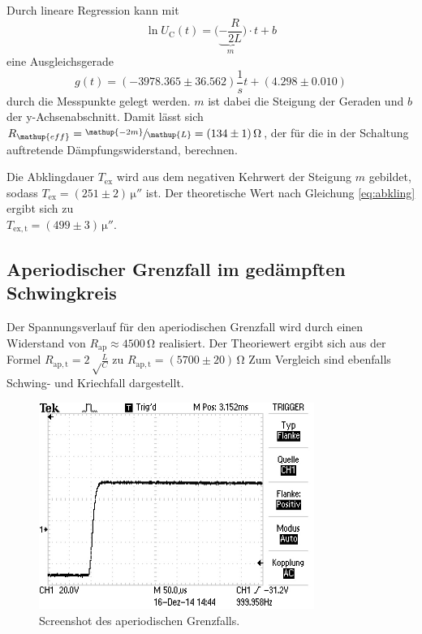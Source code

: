 Durch lineare Regression kann mit
\begin{equation}
\ln{U_\mathup{C}}(t)=\bigl(\underbrace{-\frac{R}{2L}}_m\bigr)\cdot t +b
\end{equation}
eine Ausgleichsgerade 
\begin{equation}
g(t)=(-3978.365\pm 36.562)\frac{1}{s} t + (4.298\pm0.010)
\end{equation}
durch die Messpunkte gelegt werden. 
$m$ ist dabei die Steigung der Geraden und $b$ der y-Achsenabschnitt.
Damit lässt sich $R_\mathup{eff}=\sfrac{\mathup{-2m}}{\mathup{L}}=(134\pm1)\,\si\ohm$, der für die in der Schaltung auftretende Dämpfungswiderstand, berechnen. 

Die Abklingdauer $T_\mathup{ex}$ wird aus dem negativen Kehrwert der Steigung $m$ gebildet, sodass $T_\mathup{ex}=(251\pm2)\,\si{\micro{\second}}$ ist.
Der theoretische Wert nach Gleichung \eqref{eq:abkling} ergibt sich zu \\$T_\mathup{ex,t}=(499\pm3)\,\si{\micro{\second}}$.


\subsection{Aperiodischer Grenzfall im gedämpften Schwingkreis}
Der Spannungsverlauf für den aperiodischen Grenzfall wird durch einen Widerstand von $R_\mathup{ap}\approx4500\,\si\ohm$ realisiert. 
Der Theoriewert ergibt sich aus der Formel $R_\mathup{ap,t}=2\sqrt\frac{L}{C}$ zu $R_\mathup{ap,t}=(5700\pm20)\,\si\ohm$
 Zum Vergleich sind ebenfalls Schwing- und Kriechfall dargestellt.
\newpage
\begin{figure}[h]
		\centering
		\includegraphics[width=0.8\textwidth]{Bilder/Aperiodischer.JPG}
		\caption{Screenshot des aperiodischen Grenzfalls.}
\end{figure}


